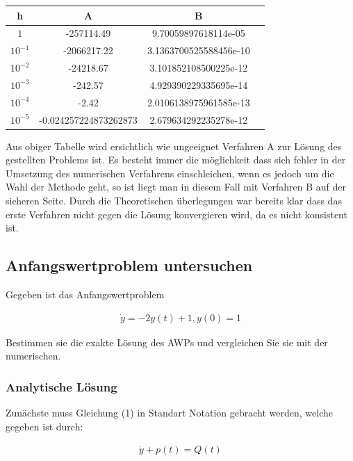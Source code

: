 \documentclass{article}
\begin{document}
		\begin{table}[!h]
		\centering
		\begin{tabular}{c c c c}
			\bf h & \bf A & \bf B \\
			\hline
			$1$ & -257114.49 & 9.70059897618114e-05\\
			$10^{-1}$ & -2066217.22 & 3.1363700525588456e-10 \\
			$10^{-2}$ & -24218.67 & 3.101852108500225e-12 \\
			$10^{-3}$ & -242.57 & 4.929390229335695e-14 \\
			$10^{-4}$ & -2.42 & 2.0106138975961585e-13 \\
			$10^{-5}$ & -0.024257224873262873 & 2.679634292235278e-12 \\
		\end{tabular}
		\end{table}
		
		Aus obiger Tabelle wird ersichtlich wie ungeeignet Verfahren A zur Lösung des gestellten Problems ist. Es besteht immer die möglichkeit dass sich fehler in der Umsetzung des numerischen Verfahrens einschleichen, wenn es jedoch um die Wahl der Methode geht, so ist liegt man in diesem Fall mit Verfahren B auf der sicheren Seite. Durch die Theoretischen überlegungen war bereits klar dass das erste Verfahren
		nicht gegen die Lösung konvergieren wird, da es nicht konsistent ist.
		
	\subsection{Anfangswertproblem untersuchen}
	
		Gegeben ist das Anfangswertproblem
	
		\begin{align}
			\dot{y} = -2y(t) + 1 , y(0) = 1
		\end{align}
		
		Bestimmen sie die exakte Lösung des AWPs und vergleichen Sie sie mit der numerischen.

		\subsubsection{Analytische Lösung}
		
			Zunächste muss Gleichung (1) in Standart Notation gebracht werden, welche gegeben ist durch:
			
			\begin{align*}
				\dot{y} + p(t) = Q(t)
			\end{align*}
			
\end{document}
